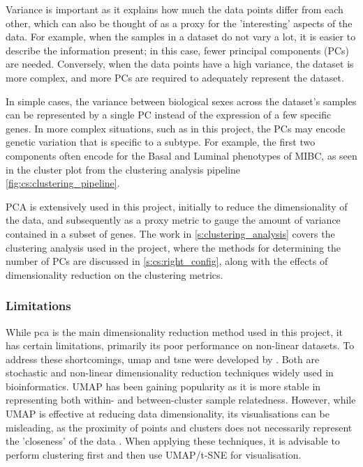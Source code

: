 
Variance is important as it explains how much the data points differ from each other, which can also be thought of as a proxy for the 'interesting' aspects of the data. For example, when the samples in a dataset do not vary a lot, it is easier to describe the information present; in this case, fewer principal components (PCs) are needed. Conversely, when the data points have a high variance, the dataset is more complex, and more PCs are required to adequately represent the dataset.

In simple cases, the variance between biological sexes across the dataset's samples can be represented by a single PC instead of the expression of a few specific genes. In more complex situations, such as in this project, the PCs may encode genetic variation that is specific to a subtype. For example, the first two components often encode for the Basal and Luminal phenotypes of MIBC, as seen in the cluster plot from the clustering analysis pipeline \cref{fig:cs:clustering_pipeline}.

PCA is extensively used in this project, initially to reduce the dimensionality of the data, and subsequently as a proxy metric to gauge the amount of variance contained in a subset of genes. The work in \cref{s:clustering_analysis} covers the clustering analysis used in the project, where the methods for determining the number of PCs are discussed in \cref{s:cs:right_config}, along with the effects of dimensionality reduction on the clustering metrics.


\subsubsection*{Limitations}

While \acrshort{pca} is the main dimensionality reduction method used in this project, it has certain limitations, primarily its poor performance on non-linear datasets. To address these shortcomings, \acrfull{umap} and \acrfull{tsne} were developed by \citep{McInnes2018-dz,Hinton2002-pz} . Both are stochastic and non-linear dimensionality reduction techniques widely used in bioinformatics. UMAP has been gaining popularity as it is more stable in representing both within- and between-cluster sample relatedness. However, while UMAP is effective at reducing data dimensionality, its visualisations can be misleading, as the proximity of points and clusters does not necessarily represent the 'closeness' of the data \citep{Chari2023-et}. When applying these techniques, it is advisable to perform clustering first and then use UMAP/t-SNE for visualisation.


